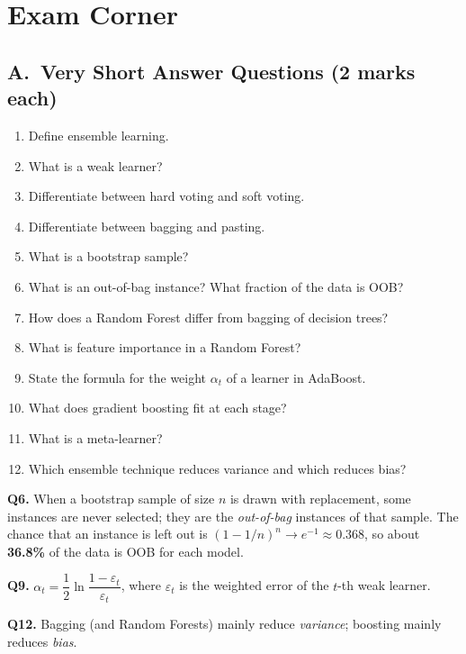 \section*{Exam Corner}

\subsection*{A.\ Very Short Answer Questions (2 marks each)}
\begin{enumerate}
  \item Define ensemble learning. 
  \item What is a weak learner? 
  \item Differentiate between hard voting and soft voting. 
  \item Differentiate between bagging and pasting. 
  \item What is a bootstrap sample? 
  \item What is an out-of-bag instance? What fraction of the data is OOB? 
  \item How does a Random Forest differ from bagging of decision trees? 
  \item What is feature importance in a Random Forest? 
  \item State the formula for the weight $\alpha_t$ of a learner in AdaBoost. 
  \item What does gradient boosting fit at each stage? 
  \item What is a meta-learner? 
  \item Which ensemble technique reduces variance and which reduces bias? 
\end{enumerate}

\begin{modelans}[: Q6, Q9 and Q12]
\textbf{Q6.} When a bootstrap sample of size $n$ is drawn with replacement, some instances are never selected; they are the \emph{out-of-bag} instances of that sample. The chance that an instance is left out is $(1-1/n)^n\to e^{-1}\approx0.368$, so about \textbf{36.8\%} of the data is OOB for each model.\par
\textbf{Q9.} $\alpha_t=\dfrac12\ln\dfrac{1-\varepsilon_t}{\varepsilon_t}$, where $\varepsilon_t$ is the weighted error of the $t$-th weak learner.\par
\textbf{Q12.} Bagging (and Random Forests) mainly reduce \emph{variance}; boosting mainly reduces \emph{bias}.
\end{modelans}

